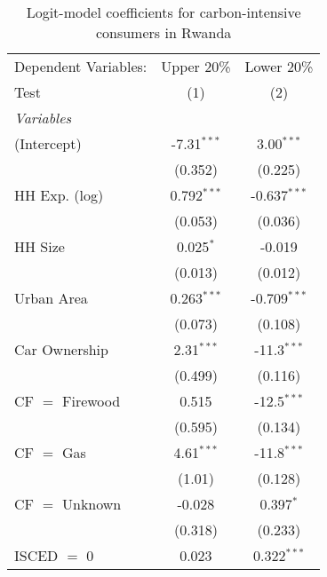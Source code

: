 
\begin{table}[htbp!]
   \centering
   \small
   \begin{adjustbox}{width = 1\textwidth, max height = 0.95\textheight, center}
      \begin{threeparttable}[b]
         \caption{\label{tab:Logit_1_RWA} Logit-model coefficients for carbon-intensive consumers in Rwanda}
         \begin{tabular}{lcc}
            \tabularnewline \midrule \midrule
            Dependent Variables: & Upper 20\%    & Lower 20\%\\   
            Test                 & (1)           & (2)\\  
            \midrule
            \emph{Variables}\\
            (Intercept)          & -7.31$^{***}$ & 3.00$^{***}$\\   
                                 & (0.352)       & (0.225)\\   
            HH Exp. (log)        & 0.792$^{***}$ & -0.637$^{***}$\\   
                                 & (0.053)       & (0.036)\\   
            HH Size              & 0.025$^{*}$   & -0.019\\   
                                 & (0.013)       & (0.012)\\   
            Urban Area           & 0.263$^{***}$ & -0.709$^{***}$\\   
                                 & (0.073)       & (0.108)\\   
            Car Ownership        & 2.31$^{***}$  & -11.3$^{***}$\\   
                                 & (0.499)       & (0.116)\\   
            CF $=$ Firewood      & 0.515         & -12.5$^{***}$\\   
                                 & (0.595)       & (0.134)\\   
            CF $=$ Gas           & 4.61$^{***}$  & -11.8$^{***}$\\   
                                 & (1.01)        & (0.128)\\   
            CF $=$ Unknown       & -0.028        & 0.397$^{*}$\\   
                                 & (0.318)       & (0.233)\\   
            ISCED $=$ 0          & 0.023         & 0.322$^{***}$\\   

\end{tabular}
\end{threeparttable}
\end{adjustbox}
\end{table}

